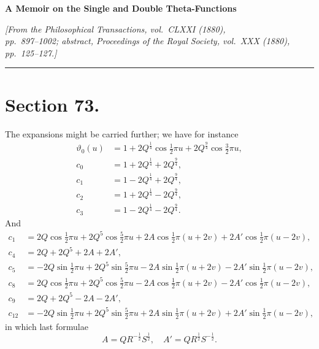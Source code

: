 \documentclass[11pt,a4paper]{article}
\newcommand{\uth}[1]{\vartheta_{#1}}
\begin{document}
\begin{center}
\Large\textbf{A Memoir on the Single and Double Theta-Functions}
\end{center}

\begin{center}
\textit{[From the \textit{Philosophical Transactions}, vol.\ CLXXI (1880),\\
pp.\ 897--1002; abstract, \textit{Proceedings of the Royal Society}, vol.\ XXX (1880),\\
pp.\ 125--127.]}
\end{center}

\vspace{1em}
\noindent\rule{\textwidth}{0.4pt}
\vspace{1em}


\section*{Section 73.}
\label{sec:73}

The expansions might be carried further; we have for instance
\begin{align*}
\uth{0}(u) &= 1 + 2Q^{\frac{1}{4}}\cos\tfrac{1}{2}\pi u + 2Q^{\frac{9}{4}}\cos\tfrac{3}{2}\pi u, \\
c_0 &= 1 + 2Q^{\frac{1}{4}} + 2Q^{\frac{9}{4}}, \\
c_1 &= 1 - 2Q^{\frac{1}{4}} + 2Q^{\frac{9}{4}}, \\
c_2 &= 1 + 2Q^{\frac{1}{4}} - 2Q^{\frac{9}{4}}, \\
c_3 &= 1 - 2Q^{\frac{1}{4}} - 2Q^{\frac{9}{4}}.
\end{align*}
And
\begin{align*}
c_1 &= 2Q\cos\tfrac{1}{2}\pi u + 2Q^5\cos\tfrac{5}{2}\pi u + 2A\cos\tfrac{1}{2}\pi(u+2v) + 2A'\cos\tfrac{1}{2}\pi(u-2v), \\
c_4 &= 2Q + 2Q^5 + 2A + 2A', \\
c_5 &= -2Q\sin\tfrac{1}{2}\pi u + 2Q^5\sin\tfrac{5}{2}\pi u - 2A\sin\tfrac{1}{2}\pi(u+2v) - 2A'\sin\tfrac{1}{2}\pi(u-2v), \\
c_8 &= 2Q\cos\tfrac{1}{2}\pi u + 2Q^5\cos\tfrac{5}{2}\pi u - 2A\cos\tfrac{1}{2}\pi(u+2v) - 2A'\cos\tfrac{1}{2}\pi(u-2v), \\
c_9 &= 2Q + 2Q^5 - 2A - 2A', \\
c_{12} &= -2Q\sin\tfrac{1}{2}\pi u + 2Q^5\sin\tfrac{5}{2}\pi u + 2A\sin\tfrac{1}{2}\pi(u+2v) + 2A'\sin\tfrac{1}{2}\pi(u-2v),
\end{align*}
in which last formulae
\[
A = QR^{-\frac{1}{2}}S^{\frac{1}{2}}, \quad A' = QR^{\frac{1}{2}}S^{-\frac{1}{2}}.
\]
\end{document}
